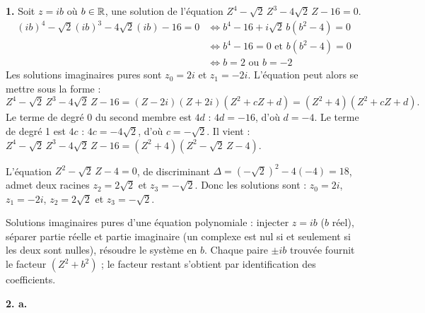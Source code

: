 \documentclass[11pt]{article}
\begin{document}


\textbf{1.} Soit $z = ib$ où $b \in \mathbb{R}$, une solution de l'équation $Z^4 - \sqrt{2}\,Z^3 - 4\sqrt{2}\,Z - 16 = 0$.
\begin{align*}
(ib)^4 - \sqrt{2}(ib)^3 - 4\sqrt{2}(ib) - 16 = 0 &\Longleftrightarrow b^4 - 16 + i\sqrt{2}\,b(b^2 - 4) = 0 \\
&\Longleftrightarrow b^4 - 16 = 0 \text{ et } b(b^2 - 4) = 0 \\
&\Longleftrightarrow b = 2 \text{ ou } b = -2
\end{align*}
Les solutions imaginaires pures sont $z_0 = 2i$ et $z_1 = -2i$. L'équation peut alors se mettre sous la forme :
\[ Z^4 - \sqrt{2}\,Z^3 - 4\sqrt{2}\,Z - 16 = (Z - 2i)(Z + 2i)(Z^2 + cZ + d) = (Z^2 + 4)(Z^2 + cZ + d). \]
Le terme de degré 0 du second membre est $4d$ : $4d = -16$, d'où $d = -4$. Le terme de degré 1 est $4c$ : $4c = -4\sqrt{2}$, d'où $c = -\sqrt{2}$. Il vient : $Z^4 - \sqrt{2}\,Z^3 - 4\sqrt{2}\,Z - 16 = (Z^2 + 4)(Z^2 - \sqrt{2}\,Z - 4)$.

L'équation $Z^2 - \sqrt{2}\,Z - 4 = 0$, de discriminant $\Delta = (-\sqrt{2})^2 - 4(-4) = 18$, admet deux racines $z_2 = 2\sqrt{2}$ et $z_3 = -\sqrt{2}$. Donc les solutions sont : $z_0 = 2i$, $z_1 = -2i$, $z_2 = 2\sqrt{2}$ et $z_3 = -\sqrt{2}$.

\begin{methode}
Solutions imaginaires pures d'une équation polynomiale : injecter
$z = ib$ ($b$ réel), séparer partie réelle et partie imaginaire (un
complexe est nul si et seulement si les deux sont nulles), résoudre le
système en $b$. Chaque paire $\pm ib$ trouvée fournit le facteur
$(Z^2 + b^2)$ ; le facteur restant s'obtient par identification des
coefficients.
\end{methode}

\textbf{2. a.} \begin{center}
\end{center}
\end{document}
